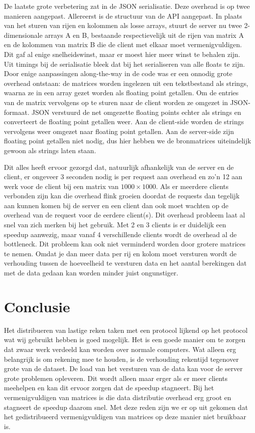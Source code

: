 \documentclass[11pt]{article}
\begin{document}
De laatste grote verbetering zat in de JSON serialisatie. Deze overhead is op twee manieren
aangepast. Allereerst is de structuur van de API aangepast. In plaats van het sturen van rijen
en kolommen als losse arrays, stuurt de server nu twee 2-dimensionale arrays A en B,
bestaande respectievelijk uit de rijen van matrix A en de kolommen van matrix B die de client
met elkaar moet vermenigvuldigen. Dit gaf al enige snelheidswinst, maar er moest hier meer winst
te behalen zijn. Uit timings bij de serialisatie bleek dat bij het serialiseren van alle floats
te zijn. Door enige aanpassingen along-the-way in de code was er een onnodig grote overhead
ontstaan: de matrices worden ingelezen uit een tekstbestand als strings, waarna ze in een array
gezet worden als floating point getallen. Om de entries van de matrix vervolgens op te sturen
naar de client worden ze omgezet in JSON-formaat. JSON verstuurd de net omgezette floating points
echter als strings en converteert de floating point getallen weer. Aan de client-side worden de
strings vervolgens weer omgezet naar floating point getallen. Aan de server-side zijn floating
point getallen niet nodig, dus hier hebben we de bronmatrices uiteindelijk gewoon als strings
laten staan.

Dit alles heeft ervoor gezorgd dat, natuurlijk afhankelijk van de server en de
client, er ongeveer 3 seconden nodig is per request aan overhead en zo'n 12 aan
werk voor de client bij een matrix van $1000\times1000$. Als er meerdere clients
verbonden zijn kan die overhead flink groeien doordat de requests dan tegelijk
aan kunnen komen bij de server en een client dan ook moet wachten op de overhead
van de request voor de eerdere client(s). Dit overhead probleem laat al snel van
zich merken bij het gebruik. Met 2 en 3 clients is er duidelijk een speedup
aanwezig, maar vanaf 4 verschillende clients wordt de overhead al de bottleneck.
Dit probleem kan ook niet verminderd worden door grotere matrices te nemen.
Omdat je dan meer data per rij en kolom moet versturen wordt de verhouding
tussen de hoeveelheid te versturen data en het aantal berekingen dat met de data
gedaan kan worden minder juist ongunstiger.


\section{Conclusie}
Het distribueren van lastige reken taken met een protocol lijkend op het protocol
wat wij gebruikt hebben is goed mogelijk. Het is een goede manier om te zorgen
dat zwaar werk verdeeld kan worden over normale computers. Wat alleen erg
belangrijk is om rekening mee te houden, is de verhouding rekentijd tegenover
grote van de dataset. De load van het versturen van de data kan voor de server
grote problemen opleveren. Dit wordt alleen maar erger als er meer clients
meehelpen en kan dit ervoor zorgen dat de speedup stagneert. Bij het
vermenigvuldigen van matrices is die data distributie overhead erg groot en
stagneert de speedup daarom snel. Met deze reden zijn we er op uit gekomen dat
het gedistribueerd vermenigvuldigen van matrices op deze manier niet bruikbaar
is.
\end{document}
